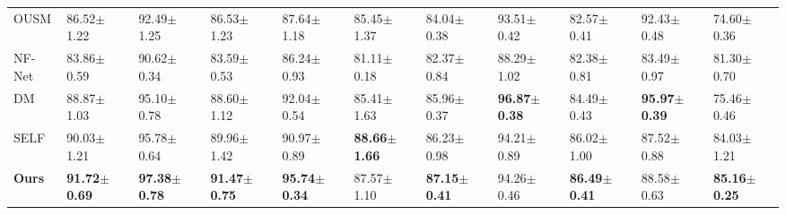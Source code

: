 \begin{table*}[]
\begin{tabular}{@{}lllllllllll@{}}
OUSM                       & 86.52$\pm$1.22          & 92.49$\pm$1.25          & 86.53$\pm$1.23               & 87.64$\pm$1.18          & 85.45$\pm$1.37             & 84.04$\pm$0.38          & 93.51$\pm$0.42          & 82.57$\pm$0.41               & 92.43$\pm$0.48          & 74.60$\pm$0.36             \\
NF-Net                          & 83.86$\pm$0.59          & 90.62$\pm$0.34          & 83.59$\pm$0.53               & 86.24$\pm$0.93          & 81.11$\pm$0.18             & 82.37$\pm$0.84          & 88.29$\pm$1.02          & 82.38$\pm$0.81               & 83.49$\pm$0.97          & 81.30$\pm$0.70             \\
DM                       & 88.87$\pm$1.03          & 95.10$\pm$0.78          & 88.60$\pm$1.12               & 92.04$\pm$0.54          & 85.41$\pm$1.63             & 85.96$\pm$0.37          & \textbf{96.87$\pm$0.38} & 84.49$\pm$0.43               & \textbf{95.97$\pm$0.39} & 75.46$\pm$0.46             \\
SELF                            & 90.03$\pm$1.21          & 95.78$\pm$0.64          & 89.96$\pm$1.42               & 90.97$\pm$0.89          & \textbf{88.66$\pm$1.66}             & 86.23$\pm$0.98          & 94.21$\pm$0.89          & 86.02$\pm$1.00               & 87.52$\pm$0.88          & 84.03$\pm$1.21             \\
\textbf{Ours}                   & \textbf{91.72$\pm$0.69} & \textbf{97.38$\pm$0.78} & \textbf{91.47$\pm$0.75}      & \textbf{95.74$\pm$0.34} & 87.57$\pm$1.10             & \textbf{87.15$\pm$0.41} & 94.26$\pm$0.46          & \textbf{86.49$\pm$0.41}      & 88.58$\pm$0.63          & \textbf{85.16$\pm$0.25}    \\ \bottomrule
\end{tabular}
\end{table*}

